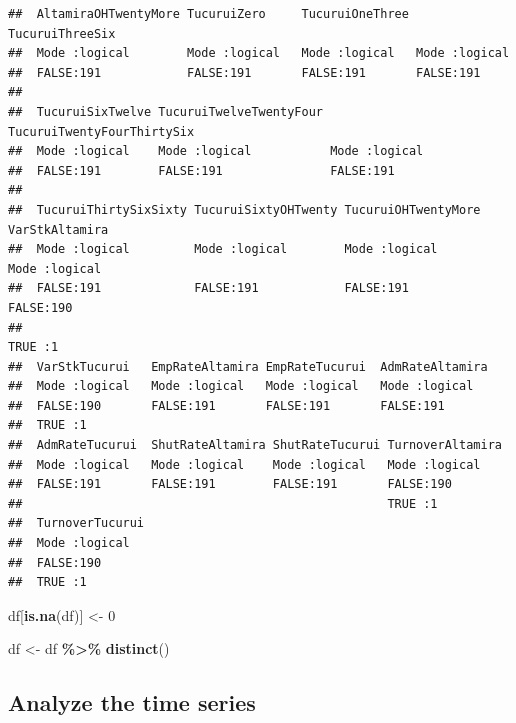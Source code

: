 \documentclass[
]{article}
\newenvironment{Shaded}{\begin{snugshade}}{\end{snugshade}}
\newcommand{\DecValTok}[1]{\textcolor[rgb]{0.00,0.00,0.81}{#1}}
\newcommand{\FunctionTok}[1]{\textcolor[rgb]{0.13,0.29,0.53}{\textbf{#1}}}
\newcommand{\NormalTok}[1]{#1}
\newcommand{\OtherTok}[1]{\textcolor[rgb]{0.56,0.35,0.01}{#1}}
\newcommand{\SpecialCharTok}[1]{\textcolor[rgb]{0.81,0.36,0.00}{\textbf{#1}}}
\begin{document}
\begin{verbatim}
##  AltamiraOHTwentyMore TucuruiZero     TucuruiOneThree TucuruiThreeSix
##  Mode :logical        Mode :logical   Mode :logical   Mode :logical  
##  FALSE:191            FALSE:191       FALSE:191       FALSE:191      
##                                                                      
##  TucuruiSixTwelve TucuruiTwelveTwentyFour TucuruiTwentyFourThirtySix
##  Mode :logical    Mode :logical           Mode :logical             
##  FALSE:191        FALSE:191               FALSE:191                 
##                                                                     
##  TucuruiThirtySixSixty TucuruiSixtyOHTwenty TucuruiOHTwentyMore VarStkAltamira 
##  Mode :logical         Mode :logical        Mode :logical       Mode :logical  
##  FALSE:191             FALSE:191            FALSE:191           FALSE:190      
##                                                                 TRUE :1        
##  VarStkTucurui   EmpRateAltamira EmpRateTucurui  AdmRateAltamira
##  Mode :logical   Mode :logical   Mode :logical   Mode :logical  
##  FALSE:190       FALSE:191       FALSE:191       FALSE:191      
##  TRUE :1                                                        
##  AdmRateTucurui  ShutRateAltamira ShutRateTucurui TurnoverAltamira
##  Mode :logical   Mode :logical    Mode :logical   Mode :logical   
##  FALSE:191       FALSE:191        FALSE:191       FALSE:190       
##                                                   TRUE :1         
##  TurnoverTucurui
##  Mode :logical  
##  FALSE:190      
##  TRUE :1
\end{verbatim}

\begin{Shaded}
\begin{Highlighting}[]
\NormalTok{df[}\FunctionTok{is.na}\NormalTok{(df)] }\OtherTok{\textless{}{-}} \DecValTok{0}
\end{Highlighting}
\end{Shaded}

\begin{Shaded}
\begin{Highlighting}[]
\NormalTok{df }\OtherTok{\textless{}{-}}\NormalTok{ df }\SpecialCharTok{\%\textgreater{}\%} \FunctionTok{distinct}\NormalTok{()}
\end{Highlighting}
\end{Shaded}

\hypertarget{analyze-the-time-series}{%
\subsection{Analyze the time series}\label{analyze-the-time-series}}
\end{document}
